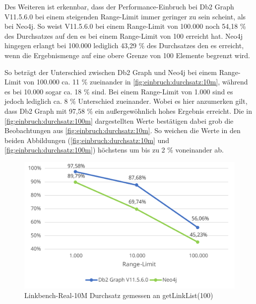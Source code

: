 Des Weiteren ist erkennbar, dass der Performance-Einbruch bei Db2 Graph V11.5.6.0 bei einem steigenden Range-Limit immer geringer zu sein scheint, als bei Neo4j. So weist V11.5.6.0 bei einem Range-Limit von 100.000 noch 54,18 \% des Durchsatzes auf den es bei einem Range-Limit von 100 erreicht hat. Neo4j hingegen erlangt bei 100.000 lediglich 43,29 \% des Durchsatzes den es erreicht, wenn die Ergebnismenge auf eine obere Grenze von 100 Elemente begrenzt wird. 

So beträgt der Unterschied zwischen Db2 Graph und Neo4j bei einem Range-Limit von 100.000 ca. 11 \% zueinander in \autoref{fig:einbruch:durchsatz:10m}, während es bei 10.000 sogar ca. 18 \% sind. Bei einem Range-Limit von 1.000 sind es jedoch lediglich ca. 8 \% Unterschied zueinander. Wobei es hier anzumerken gilt, dass Db2 Graph mit 97,58 \% ein außergewöhnlich hohes Ergebnis erreicht. Die in \autoref{fig:einbruch:durchsatz:100m} dargestellten Werte bestätigen dabei grob die Beobachtungen aus \autoref{fig:einbruch:durchsatz:10m}. So weichen die Werte in den beiden Abbildungen (\autoref{fig:einbruch:durchsatz:10m} und \autoref{fig:einbruch:durchsatz:100m}) höchstens um bis zu 2 \% voneinander ab. 

\begin{figure}[!ht]
    \centering
    \includegraphics[width=\textwidth]{images/diagramme/limit_relative_durchsatz_real_10m.pdf}
    \caption{Linkbench-Real-10M Durchsatz gemessen an getLinkList(100)}
    \label{fig:einbruch:durchsatz:10m}
\end{figure}

